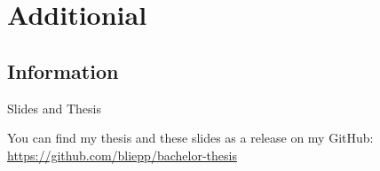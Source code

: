 \section*{Additionial}
\subsection*{Information}
\begin{frame}{Slides and Thesis}
	\vspace{2cm}
	\begin{center}
		You can find my thesis and these slides as a release on my GitHub:\\
		\url{https://github.com/bliepp/bachelor-thesis}
	\end{center}
\end{frame}
